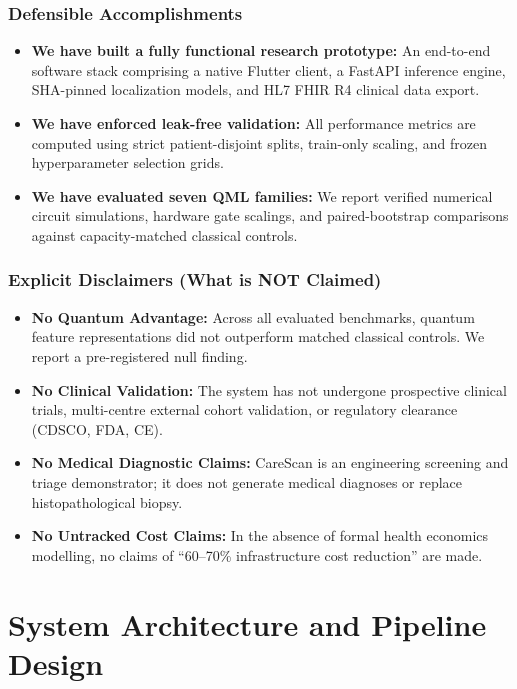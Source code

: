 \documentclass[11pt,a4paper]{report}
\begin{document}
\subsection{Defensible Accomplishments}
\begin{itemize}
  \item \textbf{We have built a fully functional research prototype:} An end-to-end software stack comprising a native Flutter client, a FastAPI inference engine, SHA-pinned localization models, and HL7 FHIR R4 clinical data export.
  \item \textbf{We have enforced leak-free validation:} All performance metrics are computed using strict patient-disjoint splits, train-only scaling, and frozen hyperparameter selection grids.
  \item \textbf{We have evaluated seven QML families:} We report verified numerical circuit simulations, hardware gate scalings, and paired-bootstrap comparisons against capacity-matched classical controls.
\end{itemize}

\subsection{Explicit Disclaimers (What is NOT Claimed)}
\begin{itemize}
  \item \textbf{No Quantum Advantage:} Across all evaluated benchmarks, quantum feature representations did not outperform matched classical controls. We report a pre-registered null finding.
  \item \textbf{No Clinical Validation:} The system has not undergone prospective clinical trials, multi-centre external cohort validation, or regulatory clearance (CDSCO, FDA, CE).
  \item \textbf{No Medical Diagnostic Claims:} CareScan is an engineering screening and triage demonstrator; it does not generate medical diagnoses or replace histopathological biopsy.
  \item \textbf{No Untracked Cost Claims:} In the absence of formal health economics modelling, no claims of ``60--70\% infrastructure cost reduction'' are made.
\end{itemize}

\chapter{System Architecture and Pipeline Design}
\end{document}
